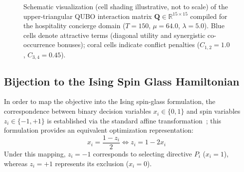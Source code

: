\documentclass[review,12pt,times,authoryear]{elsarticle}
\theoremstyle{definition}
\begin{document}
\begin{figure}[t]
\centering
{}
\caption{Schematic visualization (cell shading illustrative, not to scale) of the upper-triangular QUBO interaction matrix $\mathbf{Q} \in \mathbb{R}^{15 \times 15}$ compiled for the hospitality concierge domain ($T=150$, $\mu=64.0$, $\lambda=5.0$). Blue cells denote attractive terms (diagonal utility and synergistic co-occurrence bonuses); coral cells indicate conflict penalties ($C_{1,2} = 1.0$, $C_{3,4} = 0.45$).}
\label{fig:qubo_matrix}
\end{figure}

\subsection{Bijection to the Ising Spin Glass Hamiltonian}
In order to map the objective into the Ising spin-glass formulation, the correspondence between binary decision variables $x_i \in \{0, 1\}$ and spin variables $z_i \in \{-1, +1\}$ is established via the standard affine transformation~\citep{Lucas2014}; this formulation provides an equivalent optimization representation:
\begin{equation}
  x_i = \frac{1 - z_i}{2} \iff z_i = 1 - 2x_i
  \label{eq:spin_transform}
\end{equation}
Under this mapping, $z_i = -1$ corresponds to selecting directive $P_i$ ($x_i = 1$), whereas $z_i = +1$ represents its exclusion ($x_i = 0$).
\end{document}
